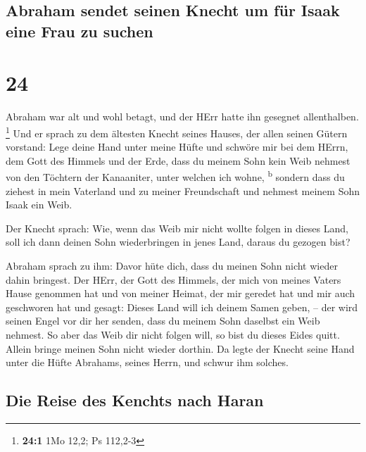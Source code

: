 \hypertarget{abraham-sendet-seinen-knecht-um-fuxfcr-isaak-eine-frau-zu-suchen}{%
\subsection{Abraham sendet seinen Knecht um für Isaak eine Frau zu
suchen}\label{abraham-sendet-seinen-knecht-um-fuxfcr-isaak-eine-frau-zu-suchen}}

\hypertarget{section-23}{%
\section{24}\label{section-23}}

 Abraham war alt und wohl betagt, und der HErr hatte ihn
gesegnet allenthalben. \footnote{\textbf{24:1} 1Mo 12,2; Ps 112,2-3}
 Und er sprach zu dem ältesten Knecht seines Hauses, der
allen seinen Gütern vorstand: Lege deine Hand unter meine Hüfte
 und schwöre mir bei dem HErrn, dem Gott des Himmels und
der Erde, dass du meinem Sohn kein Weib nehmest von den Töchtern der
Kanaaniter, unter welchen ich wohne, \textsuperscript{b} 
sondern dass du ziehest in mein Vaterland und zu meiner Freundschaft und
nehmest meinem Sohn Isaak ein Weib.

 Der Knecht sprach: Wie, wenn das Weib mir nicht wollte
folgen in dieses Land, soll ich dann deinen Sohn wiederbringen in jenes
Land, daraus du gezogen bist?

 Abraham sprach zu ihm: Davor hüte dich, dass du meinen
Sohn nicht wieder dahin bringest.  Der HErr, der Gott des
Himmels, der mich von meines Vaters Hause genommen hat und von meiner
Heimat, der mir geredet hat und mir auch geschworen hat und gesagt:
Dieses Land will ich deinem Samen geben, -- der wird seinen Engel vor
dir her senden, dass du meinem Sohn daselbst ein Weib nehmest.
 So aber das Weib dir nicht folgen will, so bist du dieses
Eides quitt. Allein bringe meinen Sohn nicht wieder dorthin.
 Da legte der Knecht seine Hand unter die Hüfte Abrahams,
seines Herrn, und schwur ihm solches.

\hypertarget{die-reise-des-kenchts-nach-haran}{%
\subsection{Die Reise des Kenchts nach
Haran}\label{die-reise-des-kenchts-nach-haran}}

